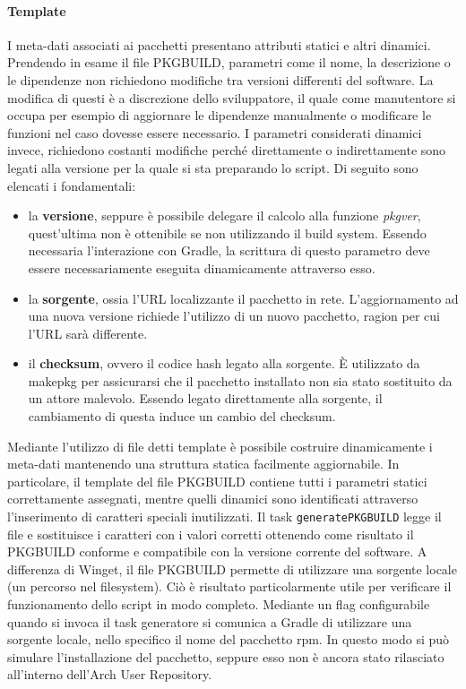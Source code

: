 \paragraph{Template} I meta-dati associati ai pacchetti presentano attributi statici e altri dinamici. Prendendo in esame il file PKGBUILD, parametri come il nome, la descrizione o le dipendenze non richiedono modifiche tra versioni differenti del software. La modifica di questi è a discrezione dello sviluppatore, il quale come manutentore si occupa per esempio di aggiornare le dipendenze manualmente o modificare le funzioni nel caso dovesse essere necessario. I parametri considerati dinamici invece, richiedono costanti modifiche perché direttamente o indirettamente sono legati alla versione per la quale si sta preparando lo script. Di seguito sono elencati i fondamentali:
\begin{itemize}
	\item la \textbf{versione}, seppure è possibile delegare il calcolo alla funzione \textit{pkgver}, quest'ultima non è ottenibile se non utilizzando il build system. Essendo necessaria l'interazione con Gradle, la scrittura di questo parametro deve essere necessariamente eseguita dinamicamente attraverso esso.
	\item la \textbf{sorgente}, ossia l'URL localizzante il pacchetto in rete. L'aggiornamento ad una nuova versione richiede l'utilizzo di un nuovo pacchetto, ragion per cui l'URL sarà differente.
	\item il \textbf{checksum}, ovvero il codice hash legato alla sorgente. È utilizzato da makepkg per assicurarsi che il pacchetto installato non sia stato sostituito da un attore malevolo. Essendo legato direttamente alla sorgente, il cambiamento di questa induce un cambio del checksum.
\end{itemize}
Mediante l'utilizzo di file detti template è possibile costruire dinamicamente i meta-dati mantenendo una struttura statica facilmente aggiornabile. In particolare, il template del file PKGBUILD contiene tutti i parametri statici correttamente assegnati, mentre quelli dinamici sono identificati attraverso l'inserimento di caratteri speciali inutilizzati. Il task \texttt{generatePKGBUILD} legge il file e sostituisce i caratteri con i valori corretti ottenendo come risultato il PKGBUILD conforme e compatibile con la versione corrente del software. A differenza di Winget, il file PKGBUILD permette di utilizzare una sorgente locale (un percorso nel filesystem). Ciò è risultato particolarmente utile per verificare il funzionamento dello script in modo completo. Mediante un flag configurabile quando si invoca il task generatore si comunica a Gradle di utilizzare una sorgente locale, nello specifico il nome del pacchetto rpm. In questo modo si può simulare l'installazione del pacchetto, seppure esso non è ancora stato rilasciato all'interno dell'Arch User Repository.

